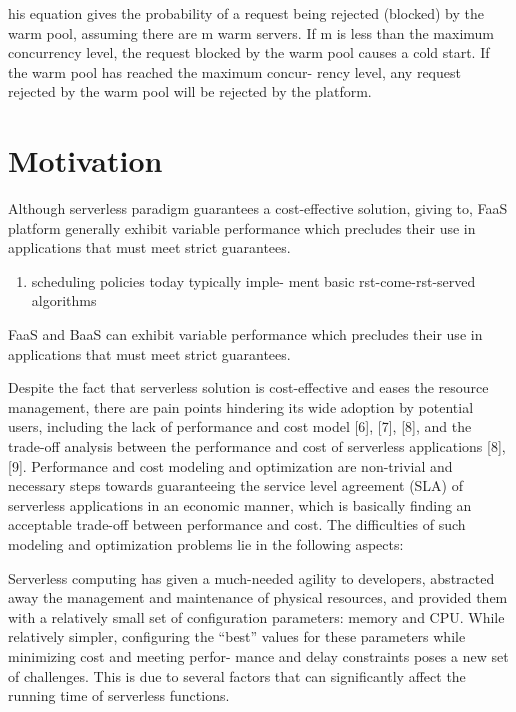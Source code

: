 \documentclass[12pt,a4paper]{report}
\theoremstyle{definition}
\begin{document}
his equation gives the probability of a request being
rejected (blocked) by the warm pool, assuming there are m
warm servers. If m is less than the maximum concurrency
level, the request blocked by the warm pool causes a cold
start. If the warm pool has reached the maximum concur-
rency level, any request rejected by the warm pool will be
rejected by the platform.


\section{Motivation}

Although serverless paradigm guarantees a cost-effective solution, giving to, FaaS platform generally exhibit variable performance which precludes their use in applications that must meet strict guarantees.
 
\begin{enumerate}
	\item scheduling policies today typically imple-
	ment basic rst-come-rst-served algorithms
\end{enumerate}




FaaS and BaaS can exhibit variable
performance which precludes their
use in applications that must meet
strict guarantees.



Despite the fact that serverless solution is cost-effective
and eases the resource management, there are pain points
hindering its wide adoption by potential users, including
the lack of performance and cost model [6], [7], [8], and
the trade-off analysis between the performance and cost
of serverless applications [8], [9]. Performance and cost
modeling and optimization are non-trivial and necessary
steps towards guaranteeing the service level agreement
(SLA) of serverless applications in an economic manner,
which is basically finding an acceptable trade-off between
performance and cost. The difficulties of such modeling and
optimization problems lie in the following aspects:



Serverless computing has given a much-needed agility to
developers, abstracted away the management and maintenance
of physical resources, and provided them with a relatively
small set of conﬁguration parameters: memory and CPU.
While relatively simpler, conﬁguring the “best” values for
these parameters while minimizing cost and meeting perfor-
mance and delay constraints poses a new set of challenges.
This is due to several factors that can signiﬁcantly aﬀect the
running time of serverless functions.
\end{document}
